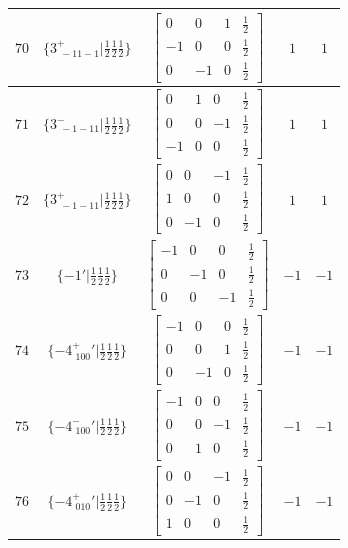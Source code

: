 \documentclass[fleqn,8pt]{jsarticle}
\begin{document}
\begin{longtable}{ccccc}
$ 70 $ & $ \{3^{+}_{\,\,-11-1}|\frac{1}{2} \frac{1}{2} \frac{1}{2}\} $ & $ \begin{bmatrix} 0 & 0 & 1 & \frac{1}{2} \\ -1 & 0 & 0 & \frac{1}{2} \\ 0 & -1 & 0 & \frac{1}{2} \end{bmatrix} $ & $ 1 $ & $ 1 $ \\ \hline
$ 71 $ & $ \{3^{-}_{\,\,-1-11}|\frac{1}{2} \frac{1}{2} \frac{1}{2}\} $ & $ \begin{bmatrix} 0 & 1 & 0 & \frac{1}{2} \\ 0 & 0 & -1 & \frac{1}{2} \\ -1 & 0 & 0 & \frac{1}{2} \end{bmatrix} $ & $ 1 $ & $ 1 $ \\ \hline
$ 72 $ & $ \{3^{+}_{\,\,-1-11}|\frac{1}{2} \frac{1}{2} \frac{1}{2}\} $ & $ \begin{bmatrix} 0 & 0 & -1 & \frac{1}{2} \\ 1 & 0 & 0 & \frac{1}{2} \\ 0 & -1 & 0 & \frac{1}{2} \end{bmatrix} $ & $ 1 $ & $ 1 $ \\ \hline
$ 73 $ & $ \{-1{}'|\frac{1}{2} \frac{1}{2} \frac{1}{2}\} $ & $ \begin{bmatrix} -1 & 0 & 0 & \frac{1}{2} \\ 0 & -1 & 0 & \frac{1}{2} \\ 0 & 0 & -1 & \frac{1}{2} \end{bmatrix} $ & $ -1 $ & $ -1 $ \\ \hline
$ 74 $ & $ \{-4^{+}_{\,\,100}{}'|\frac{1}{2} \frac{1}{2} \frac{1}{2}\} $ & $ \begin{bmatrix} -1 & 0 & 0 & \frac{1}{2} \\ 0 & 0 & 1 & \frac{1}{2} \\ 0 & -1 & 0 & \frac{1}{2} \end{bmatrix} $ & $ -1 $ & $ -1 $ \\ \hline
$ 75 $ & $ \{-4^{-}_{\,\,100}{}'|\frac{1}{2} \frac{1}{2} \frac{1}{2}\} $ & $ \begin{bmatrix} -1 & 0 & 0 & \frac{1}{2} \\ 0 & 0 & -1 & \frac{1}{2} \\ 0 & 1 & 0 & \frac{1}{2} \end{bmatrix} $ & $ -1 $ & $ -1 $ \\ \hline
$ 76 $ & $ \{-4^{+}_{\,\,010}{}'|\frac{1}{2} \frac{1}{2} \frac{1}{2}\} $ & $ \begin{bmatrix} 0 & 0 & -1 & \frac{1}{2} \\ 0 & -1 & 0 & \frac{1}{2} \\ 1 & 0 & 0 & \frac{1}{2} \end{bmatrix} $ & $ -1 $ & $ -1 $ \\ \hline

\end{longtable}
\end{document}
